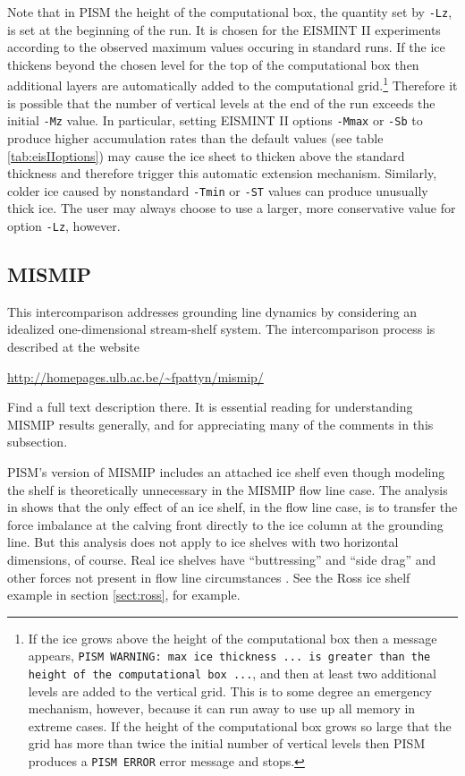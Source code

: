 \documentclass[11pt,final]{amsart}
\begin{document}
Note that in PISM the height of the computational box, the quantity set by \verb|-Lz|, is set at the beginning of the run.  It is chosen for the EISMINT II experiments according to the observed maximum values occuring in standard runs.  If the ice thickens beyond the chosen level for the top of the computational box then additional layers are automatically added to the computational grid.\footnote{If the ice grows above the height of the computational box then a message appears, \texttt{PISM WARNING: max ice thickness ... is greater than the height of the computational box ...}, and then at least two additional levels are added to the vertical grid.  This is to some degree an emergency mechanism, however, because it can run away to use up all memory in extreme cases.  If the height of the computational box grows so large that the grid has more than twice the initial number of vertical levels then PISM produces a \texttt{PISM ERROR} error message and stops.}   Therefore it is possible that the number of vertical levels at the end of the run exceeds the initial \verb|-Mz| value.  In particular, setting EISMINT II options \verb|-Mmax| or \verb|-Sb| to produce higher accumulation rates than the default values (see table \ref{tab:eisIIoptions}) may cause the ice sheet to thicken above the standard thickness and therefore trigger this automatic extension mechanism.  Similarly, colder ice caused by nonstandard \verb|-Tmin| or \verb|-ST| values can produce unusually thick ice.  The user may always choose to use a larger, more conservative value for option \verb|-Lz|, however.

\subsection{MISMIP}\label{subsect:MISMIP}  This intercomparison addresses grounding line dynamics by considering an idealized one-dimensional stream-shelf system.  The intercomparison process is described at the website

\centerline{\url{http://homepages.ulb.ac.be/~fpattyn/mismip/}}

\noindent Find a full text description there.  It is essential reading for understanding MISMIP results generally, and for appreciating many of the comments in this subsection.

PISM's version of MISMIP includes an attached ice shelf even though modeling the shelf is theoretically unnecessary in the MISMIP flow line case.  The analysis in \cite{SchoofMarine1} shows that the only effect of an ice shelf, in the flow line case, is to transfer the force imbalance at the calving front directly to the ice column at the grounding line.  But this analysis does not apply to ice shelves with two horizontal dimensions, of course.  Real ice shelves have ``buttressing'' and ``side drag'' and other forces not present in flow line circumstances \cite{Goldbergetal2009}.  See the Ross ice shelf example in section \ref{sect:ross}, for example.
\end{document}
